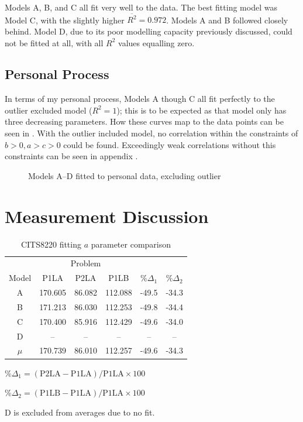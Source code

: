 \documentclass[a4paper,10pt]{article}
\begin{document}
Models A, B, and C all fit very well to the data. The best fitting model was Model C, with the slightly higher $\overline{R^2} = 0.972$. Models A and B followed closely behind. Model D, due to its poor modelling capacity previously discussed, could not be fitted at all, with all $R^2$ values equalling zero.

\subsection{Personal Process}
In terms of my personal process, Models A though C all fit perfectly to the outlier excluded model ($R^2=1$); this is to be expected as that model only has three decreasing parameters. How these curves map to the data points can be seen in . With the outlier included model, no correlation within the constraints of $b > 0, a>c>0$ could be found. Exceedingly weak correlations without this constraints can be seen in appendix .

\begin{figure}
\centering

\caption{Models A--D fitted to personal data, excluding outlier}
\label{fig:myexcl-totalplot}
\end{figure}

\section{Measurement Discussion}

\begin{table}
  \centering
  \begin{threeparttable} 
    \begin{tabular}{|c|ccc|cc|}
      \hline
      \multicolumn{1}{|c|}{} & \multicolumn{3}{|c|}{Problem} & & \\
      Model & P1LA & P2LA & P1LB & $\%\Delta_1$ & $\%\Delta_2$ \\ \cline{2-6}
      A & 170.605 & 86.082 & 112.088 & -49.5 & -34.3 \\
      B & 171.213 & 86.030 & 112.253 & -49.8 & -34.4 \\
      C & 170.400 & 85.916 & 112.429 & -49.6 & -34.0 \\
      D & -- & -- & -- & -- & -- \\ \hline
      $\mu$ & 170.739 & 86.010 & 112.257 & -49.6 & -34.3 \\ \hline
    \end{tabular}
    \begin{tablenotes}
     \item \%$\Delta_1 = (\mathrm{P2LA} - \mathrm{P1LA})/\mathrm{P1LA} \times 100$
     \item \%$\Delta_2 = (\mathrm{P1LB} - \mathrm{P1LA})/\mathrm{P1LA} \times 100$
     \item D is excluded from averages due to no fit.
    \end{tablenotes}
    \caption{CITS8220 fitting $a$ parameter comparison}
    \label{tab:acomp}
  \end{threeparttable}
\end{table}
\end{document}
